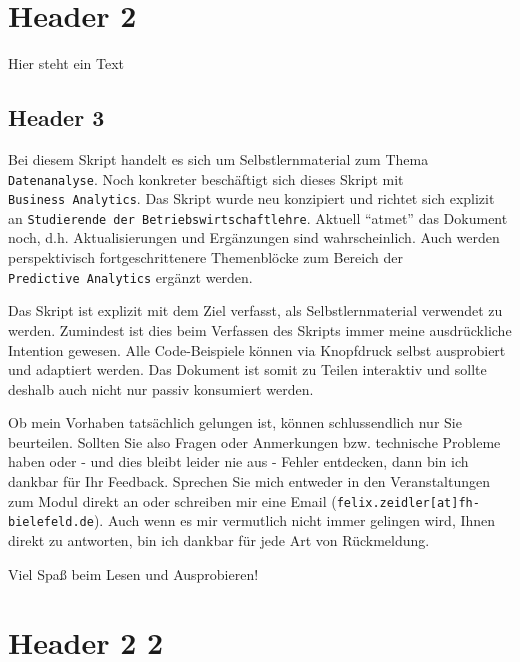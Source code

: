 \documentclass[
  letterpaper,
  DIV=11]{scrreprt}
\begin{document}
\hypertarget{header-2}{%
\section*{Header 2}\label{header-2}}


Hier steht ein Text

\hypertarget{header-3}{%
\subsection*{Header 3}\label{header-3}}

Bei diesem Skript handelt es sich um Selbstlernmaterial zum Thema
\texttt{Datenanalyse}. Noch konkreter beschäftigt sich dieses Skript mit
\texttt{Business\ Analytics}. Das Skript wurde neu konzipiert und
richtet sich explizit an
\texttt{Studierende\ der\ Betriebswirtschaftlehre}. Aktuell ``atmet''
das Dokument noch, d.h. Aktualisierungen und Ergänzungen sind
wahrscheinlich. Auch werden perspektivisch fortgeschrittenere
Themenblöcke zum Bereich der \texttt{Predictive\ Analytics} ergänzt
werden.

Das Skript ist explizit mit dem Ziel verfasst, als Selbstlernmaterial
verwendet zu werden. Zumindest ist dies beim Verfassen des Skripts immer
meine ausdrückliche Intention gewesen. Alle Code-Beispiele können via
Knopfdruck selbst ausprobiert und adaptiert werden. Das Dokument ist
somit zu Teilen interaktiv und sollte deshalb auch nicht nur passiv
konsumiert werden.

Ob mein Vorhaben tatsächlich gelungen ist, können schlussendlich nur Sie
beurteilen. Sollten Sie also Fragen oder Anmerkungen bzw. technische
Probleme haben oder - und dies bleibt leider nie aus - Fehler entdecken,
dann bin ich dankbar für Ihr Feedback. Sprechen Sie mich entweder in den
Veranstaltungen zum Modul direkt an oder schreiben mir eine Email
(\texttt{felix.zeidler{[}at{]}fh-bielefeld.de}). Auch wenn es mir
vermutlich nicht immer gelingen wird, Ihnen direkt zu antworten, bin ich
dankbar für jede Art von Rückmeldung.

Viel Spaß beim Lesen und Ausprobieren!

\hypertarget{header-2-2}{%
\section*{Header 2 2}\label{header-2-2}}
\end{document}
